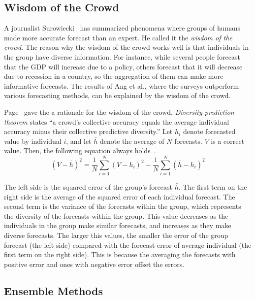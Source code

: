 \documentclass[../main.tex]{subfiles}
\begin{document}
\subsection{Wisdom of the Crowd}
\label{sub: Wisdom of the Crowd}

A journalist Surowiecki~\cite{Surowiecki2004} has summarized phenomena where groups of humans made more accurate forecast than an expert.  He called it the \emph{wisdom of the crowd}.
The reason why the wisdom of the crowd works well is that individuals in the group have diverse information.
For instance, while several people forecast that the GDP will increase due to a policy, others forecast that it will decrease due to recession in a country, so the aggregation of them can make more informative forecasts.
The results of Ang et al., where the surveys outperform various forecasting methods, can be explained by the wisdom of the crowd.

Page~\cite{Page2008} gave the a rationale for the wisdom of the crowd.
\emph{Diversity prediction theorem} states ``a crowd's collective accuracy equals the average individual accuracy minus their collective predictive diversity.''
Let $h_i$ denote forecasted value by individual $i$, and let $\bar{h}$ denote the average of $N$ forecasts.  $V$ is a correct value.
Then, the following equation always holds~\cite{Krogh1995, Page2008}.
\begin{equation}
  {(V - \bar{h})}^2 = \frac{1}{N}\sum_{i=1}^N {(V - h_i)}^2 - \frac{1}{N}\sum_{i=1}^N {(\bar{h} - h_i)}^2
\end{equation}

The left side is the squared error of the group's forecast $\bar{h}$.
The first term on the right side is the average of the squared error of each individual forecast.
The second term is the variance of the forecasts within the group, which represents the diversity of the forecasts within the group.
This value decreases as the individuals in the group make similar forecasts, and increases as they make diverse forecasts.
The larger this values, the smaller the error of the group forecast (the left side) compared with the forecast error of average individual (the first term on the right side).
This is because the averaging the forecasts with positive error and ones with negative error offset the errors.

\subsection{Ensemble Methods}
\label{sub: Ensemble Methods}
\end{document}
